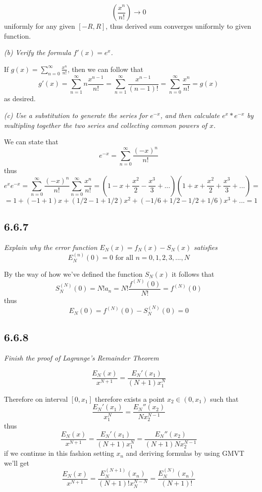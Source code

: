 \documentclass[11pt,oneside,titlepage]{book}
\begin{document}
$$(\frac{x^n}{n!}) \to 0$$
uniformly for any given $[-R, R]$, thus derived sum converges uniformly to
given function.

\textit{(b) Verify the formula $f'(x) = e^x$.}

If $g(x) = \sum_{n = 0}^{\infty}{\frac{x^n}{n!}}$, then we can follow that
$$g'(x) = \sum_{n = 1}^{\infty}{n \frac{x^{n - 1}}{n!}} =
\sum_{n = 1}^{\infty}{\frac{x^{n - 1}}{(n - 1)!}} =
\sum_{n = 0}^{\infty}{\frac{x^{n}}{n!}}  = g(x)$$
as desired.

\textit{(c) Use a substitution to generate the series for $e^{-x}$, and
  then calculate $e^x * e^{-x}$ by multipling together the two series and
  collecting common powers of $x$.}

We can state that
$$e^{-x} = \sum_{n = 0}^{\infty}{\frac{(-x)^n}{n!}}$$
thus
$$e^x e^{-x} = \sum_{n = 0}^{\infty}{\frac{(-x)^n}{n!}}
\sum_{n = 0}^{\infty}{\frac{x^n}{n!}} =
(1 - x + \frac{x^2}{2} - \frac{x^3}{3} + ... )(
1 + x + \frac{x^2}{2} + \frac{x^3}{3} + ... ) =
$$
$$
= 1 + (-1 + 1)x + (1/2 - 1 + 1/2)x^2 + (-1/6 + 1/2 - 1/2 + 1/6)x^3 + ... = 1
$$


\subsection*{6.6.7}
\textit{Explain why the error function $E_N(x) = f_N(x) - S_N(x)$
  satisfies}
$$E_N^{(n)}(0) = 0 \text{ for all } n = 0, 1, 2, 3, ..., N$$

By the way of how we've defined the function $S_N(x)$ it follows that
$$S_N^{(N)}(0) = N! a_n = N! \frac{f^{(N)}(0)}{N!} = f^{(N)}(0)$$
thus
$$E_N(0) = f^{(N)}(0) - S_N^{(N)}(0) =  0$$


\subsection*{6.6.8}

\textit{Finish the proof of Lagrange's Remainder Theorem}

$$\frac{E_N(x)}{x^{N + 1}} = \frac{E_N'(x_1)}{(N + 1)x_1^{N}}$$

Therefore on interval $[0, x_1]$ therefore exists a point $x_2 \in (0, x_1)$
such that
$$\frac{E_N'(x_1)}{x_1^{N}} = \frac{E_N''(x_2)}{Nx_2^{N - 1}}$$
thus
$$\frac{E_N(x)}{x^{N + 1}} = \frac{E_N'(x_1)}{(N + 1)x_1^{N}} =
\frac{E_N''(x_2)}{(N + 1)Nx_2^{N - 1}}$$
if we continue in this fashion setting $x_n$ and deriving formulas
by using GMVT we'll get
$$\frac{E_N(x)}{x^{N + 1}} = \frac{E_N^{(N + 1)}(x_n)}{(N + 1)! x_N^{N - N} } =
\frac{E_N^{(N)}(x_n)}{(N + 1)!  }$$
\end{document}
